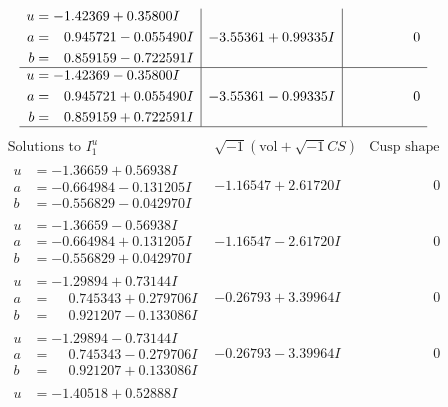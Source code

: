 \documentclass[1p]{elsarticle_modified}
\theoremstyle{definition}
\newcommand{\I}{\sqrt{-1}}
\begin{document}
$$\begin{array}{c|c|c}
\begin{aligned}
u &= -1.42369 + 0.35800 I \\
a &= \phantom{-}0.945721 - 0.055490 I \\
b &= \phantom{-}0.859159 - 0.722591 I\end{aligned}
 & -3.55361 + 0.99335 I & \phantom{-0.000000 } 0 \\ \hline\begin{aligned}
u &= -1.42369 - 0.35800 I \\
a &= \phantom{-}0.945721 + 0.055490 I \\
b &= \phantom{-}0.859159 + 0.722591 I\end{aligned}
 & -3.55361 - 0.99335 I & \phantom{-0.000000 } 0\\
 \hline 
 \end{array}$$\newpage$$\begin{array}{c|c|c}  
\text{Solutions to }I^u_{1}& \I (\text{vol} + \sqrt{-1}CS) & \text{Cusp shape}\\
 \hline 
\begin{aligned}
u &= -1.36659 + 0.56938 I \\
a &= -0.664984 - 0.131205 I \\
b &= -0.556829 - 0.042970 I\end{aligned}
 & -1.16547 + 2.61720 I & \phantom{-0.000000 } 0 \\ \hline\begin{aligned}
u &= -1.36659 - 0.56938 I \\
a &= -0.664984 + 0.131205 I \\
b &= -0.556829 + 0.042970 I\end{aligned}
 & -1.16547 - 2.61720 I & \phantom{-0.000000 } 0 \\ \hline\begin{aligned}
u &= -1.29894 + 0.73144 I \\
a &= \phantom{-}0.745343 + 0.279706 I \\
b &= \phantom{-}0.921207 - 0.133086 I\end{aligned}
 & -0.26793 + 3.39964 I & \phantom{-0.000000 } 0 \\ \hline\begin{aligned}
u &= -1.29894 - 0.73144 I \\
a &= \phantom{-}0.745343 - 0.279706 I \\
b &= \phantom{-}0.921207 + 0.133086 I\end{aligned}
 & -0.26793 - 3.39964 I & \phantom{-0.000000 } 0 \\ \hline\begin{aligned}
u &= -1.40518 + 0.52888 I \\

\end{aligned}
\end{array}$$
\end{document}
